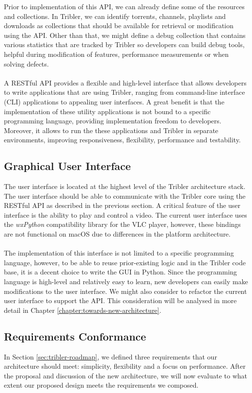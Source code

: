 \noindent Prior to implementation of this API, we can already define some of the resources and collections. In Tribler, we can identify torrents, channels, playlists and downloads as collections that should be available for retrieval or modification using the API. Other than that, we might define a debug collection that contains various statistics that are tracked by Tribler so developers can build debug tools, helpful during modification of features, performance measurements or when solving defects.\\\\
A RESTful API provides a flexible and high-level interface that allows developers to write applications that are using Tribler, ranging from command-line interface (CLI) applications to appealing user interfaces. A great benefit is that the implementation of these utility applications is not bound to a specific programming language, providing implementation freedom to developers. Moreover, it allows to run the these applications and Tribler in separate environments, improving responsiveness, flexibility, performance and testability.

\subsection{Graphical User Interface}
The user interface is located at the highest level of the Tribler architecture stack. The user interface should be able to communicate with the Tribler core using the RESTful API as described in the previous section. A critical feature of the user interface is the ability to play and control a video. The current user interface uses the \emph{wxPython} compatibility library for the VLC player, however, these bindings are not functional on macOS due to differences in the platform architecture.\\\\
The implementation of this interface is not limited to a specific programming language, however, to be able to reuse prior-existing logic and in the Tribler code base, it is a decent choice to write the GUI in Python. Since the programming language is high-level and relatively easy to learn, new developers can easily make modifications to the user interface. We might also consider to refactor the current user interface to support the API. This consideration will be analysed in more detail in Chapter \ref{chapter:towards-new-architecture}. 

\subsection{Requirements Conformance}
In Section \ref{sec:tribler-roadmap}, we defined three requirements that our architecture should meet: simplicity, flexibility and a focus on performance. After the proposal and discussion of the new architecture, we will now evaluate to what extent our proposed design meets the requirements we composed.

